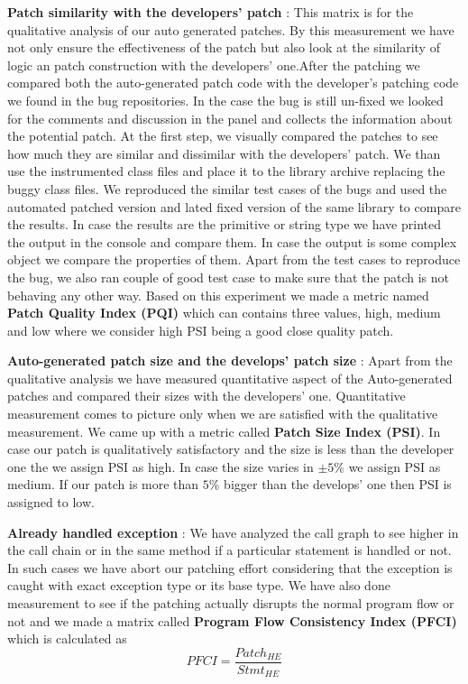 \begin{mylist}

\item \textbf{Patch similarity with the developers' patch} : This matrix is for
the qualitative analysis of our auto generated patches. By this measurement we
have not only ensure the effectiveness of the patch but also look at the
similarity of logic an patch construction with the developers' one.After the
patching we compared both the auto-generated patch code with the developer's
patching code we found in the bug repositories. In the case the bug is still
un-fixed we looked for the comments and discussion in the panel and collects
the information about the potential patch. At the first step, we visually
compared the patches to see how much they are similar and dissimilar with the
developers' patch. We than use the instrumented class files and place it to the
library archive replacing the buggy class files. We reproduced the similar test
cases of the bugs and used the automated patched version and lated fixed version
of the same library to compare the results. In case the results are the primitive
or string type we have printed the output in the console and compare them. In
case the output is some complex object we compare the properties of them. Apart
from the test cases to reproduce the bug, we also ran couple of good test case
to make sure that the patch is not behaving any other way. Based on this
experiment we made a metric named \textbf{Patch Quality Index (PQI)} which
can contains three values, high, medium and low where we consider high PSI being
a good close quality patch.

\item \textbf{Auto-generated patch size and the develops' patch size} : Apart
from the qualitative analysis we have measured quantitative aspect of the
Auto-generated patches and compared their sizes with the developers' one.
Quantitative measurement comes to picture only when we are satisfied with the
qualitative measurement. We came up with a metric called \textbf{Patch Size
Index (PSI)}. In case our patch is qualitatively satisfactory and the size is
less than the developer one the we assign PSI as high. In case the size varies
in $\pm5\%$ we assign PSI as medium. If our patch is more than $5\%$ bigger than
the develops' one then PSI is assigned to low.

\item \textbf{Already handled exception} : We have analyzed the call graph to
see higher in the call chain or in the same method if a particular statement is
handled or not. In such cases we have abort our patching effort considering that
the exception is caught with exact exception type or its base type. We have also
done measurement to see if the patching actually disrupts the normal program
flow or not and we made a matrix called \textbf{Program Flow Consistency Index
(PFCI)} which is calculated as
$$PFCI = \frac{Patch_{HE}}{Stmt_{HE}}$$


\end{mylist}
